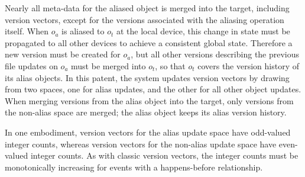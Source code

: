 Nearly all meta-data for the aliased object is merged into the target, including
version vectors, except for the versions associated with the aliasing operation
itself. When $o_a$ is aliased to $o_t$ at the local device, this change in state
must be propagated to all other devices to achieve a consistent global state.
Therefore a new version must be created for $o_a$, but all other versions
describing the previous file updates on $o_a$ must be merged into $o_t$, so that
$o_t$ covers the version history of its alias objects. In this patent, the
system updates version vectors by drawing from two spaces, one for alias
updates, and the other for all other object updates. When merging versions from
the alias object into the target, only versions from the non-alias space are
merged; the alias object keeps its alias version history.

In one embodiment, version vectors for the alias update space have odd-valued integer
counts, whereas version vectors for the non-alias update space have even-valued
integer counts. As with classic version vectors, the integer counts must be
monotonically increasing for events with a happens-before relationship.




%

